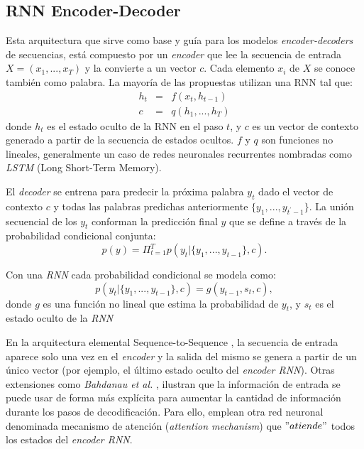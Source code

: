 \subsection{RNN Encoder-Decoder}
Esta arquitectura que sirve como base y guía para los modelos \textit{encoder-decoders} de secuencias, está compuesto por un \textit{encoder} que lee la secuencia de entrada $X = (x_1, ..., x_T)$ y la convierte a un vector $c$. Cada elemento $x_i$ de $X$ se conoce también como palabra. La mayoría de las propuestas utilizan una RNN tal que: 
\begin{eqnarray*}
	h_t & = & f(x_t, h_{t-1}) \\
	c & = & q({h_1, ..., h_T})
\end{eqnarray*}
donde $h_t$ es el estado oculto de la RNN en el paso $t$, y $c$ es un vector de contexto generado a partir de la secuencia de estados ocultos. $f$ y $q$ son funciones no lineales, generalmente un caso de redes neuronales recurrentes nombradas como  \textit{LSTM} (Long Short-Term Memory).

El \textit{decoder} se entrena para predecir la próxima palabra $y_{t}$ dado el vector de contexto $c$ y todas las palabras predichas anteriormente $\{ y_1, ..., y_{t^{'} - 1}\}$. La unión secuencial de los $y_t$ conforman la predicción final $y$ que se define a través de la probabilidad condicional conjunta:
\begin{equation}
	p(y) = \Pi_{t=1}^{T}p(y_t| \{y_1, ..., y_{t-1}\}, c).
\end{equation}

Con una \textit{RNN} cada probabilidad condicional se modela como:
\begin{equation}
	p(y_t| \{y_1, ..., y_{t-1}\}, c) = g(y_{t-1}, s_t, c),
\end{equation}
donde $g$ es una función no lineal que estima la probabilidad de $y_t$, y $s_t$ es el estado oculto de la \textit{RNN}

En la arquitectura elemental Sequence-to-Sequence \cite{SutskeverSeq2seqNN}, la secuencia de entrada aparece solo una vez en el \textit{encoder} y la salida del mismo se genera a partir de un único vector (por ejemplo, el último estado oculto del \textit{encoder RNN}). Otras extensiones como \textit{Bahdanau et al.} \cite{BahdanauAlignTrans}, ilustran que la información de entrada se puede usar de forma más explícita para aumentar la cantidad de información durante los pasos de decodificación. Para ello, emplean otra red neuronal denominada mecanismo de atención (\textit{attention mechanism}) que $"atiende"$ todos los estados del \textit{encoder RNN}.

